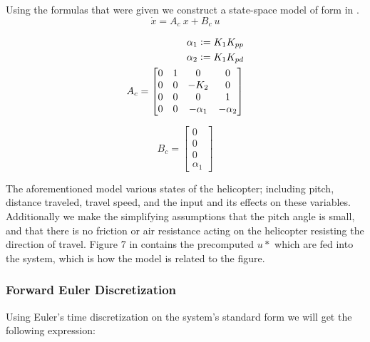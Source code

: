 Using the formulas that were given we construct a state-space model of form in .
\begin{equation}\label{eq:state-space}
	\dot{x} = A_c\ x + B_c\ u
\end{equation}

\begin{subequations}
\begin{align}
\alpha_1 \vcentcolon= K_1K_{pp} \\
\alpha_2 \vcentcolon= K_1K_{pd} \\
A_c =
\begin{bmatrix}
    0 & 1 & 0 & 0 \\
    0 & 0 & -K_2 & 0 \\
    0 & 0 & 0 & 1 \\
    0 & 0 & -\alpha_1 & - \alpha_2
\end{bmatrix}
\label{eq:initial_state}
\end{align}
\end{subequations}

\begin{equation}
B_c =
\begin{bmatrix}
	0 \\
	0 \\
	0 \\
	\alpha_1
\end{bmatrix}
\end{equation}

The aforementioned model various states of the helicopter; including pitch, distance traveled, travel speed, and the input and its effects on these variables. Additionally we make the  simplifying assumptions that the pitch angle is small, and that there is no friction or air resistance acting on the helicopter resisting the direction of travel. Figure 7 in  contains the precomputed $u*$ which are fed into the system, which is how the model is related to the figure.

\subsubsection{Forward Euler Discretization}

Using Euler's time discretization on the system's standard form we will get the following expression:

